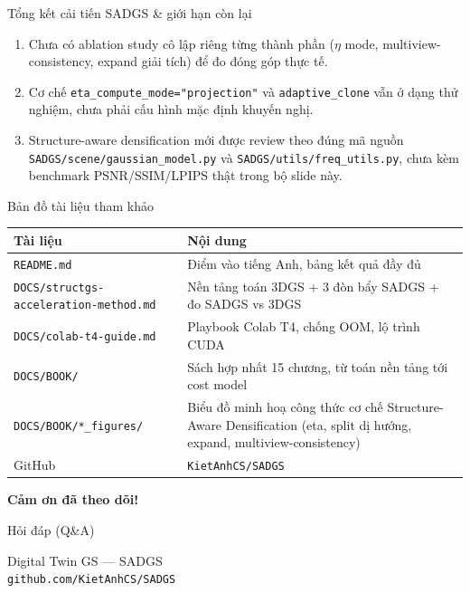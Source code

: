 \begin{frame}{Tổng kết cải tiến SADGS \& giới hạn còn lại}
\begin{enumerate}
    \item Chưa có ablation study cô lập riêng từng thành phần ($\eta$ mode, multiview-consistency, expand giải tích) để đo đóng góp thực tế.
    \item Cơ chế \texttt{eta\_compute\_mode="projection"} và \texttt{adaptive\_clone} vẫn ở dạng thử nghiệm, chưa phải cấu hình mặc định khuyến nghị.
    \item Structure-aware densification mới được review theo đúng mã nguồn \texttt{SADGS/scene/gaussian\_model.py} và \texttt{SADGS/utils/freq\_utils.py}, chưa kèm benchmark PSNR/SSIM/LPIPS thật trong bộ slide này.
\end{enumerate}
\end{frame}

\begin{frame}{Bản đồ tài liệu tham khảo}
\footnotesize
\begin{table}[]
\centering
\begin{tabular}{p{4.2cm}p{6.5cm}}
\toprule
\textbf{Tài liệu} & \textbf{Nội dung} \\
\midrule
\texttt{README.md} & Điểm vào tiếng Anh, bảng kết quả đầy đủ \\
\texttt{DOCS/structgs-\allowbreak acceleration-\allowbreak method.md} & Nền tảng toán 3DGS + 3 đòn bẩy SADGS + đo SADGS vs 3DGS \\
\texttt{DOCS/colab-t4-guide.md} & Playbook Colab T4, chống OOM, lộ trình CUDA \\
\texttt{DOCS/BOOK/} & Sách hợp nhất 15 chương, từ toán nền tảng tới cost model \\
\texttt{DOCS/BOOK/*\_figures/} & Biểu đồ minh hoạ công thức cơ chế Structure-Aware Densification (eta, split dị hướng, expand, multiview-consistency) \\
GitHub & \texttt{KietAnhCS/SADGS} \\
\bottomrule
\end{tabular}
\end{table}
\end{frame}

\begin{frame}[c]{}
\centering
{\Huge \textbf{Cảm ơn đã theo dõi!}}

\vspace{6mm}
{\LARGE Hỏi đáp (Q\&A)}

\vspace{10mm}
{\small Digital Twin GS --- SADGS \\ \texttt{github.com/KietAnhCS/SADGS}}
\end{frame}
